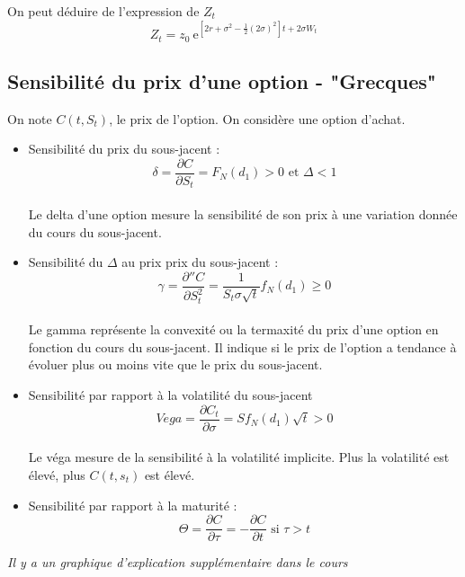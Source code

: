 \documentclass{report}
\newcommand{\e}{\mbox{e}}
\begin{document}
On peut déduire de l'expression de $Z_t$\[Z_t = z_0\ \mbox{e}^{[2r+\sigma^2-\frac{1}{2}(2\sigma)^2]t+2\sigma W_t}\]
\newpage


\subsection{Sensibilité du prix d'une option - "Grecques"}

On note $C(t, S_t)$, le prix de l'option. On considère une option d'achat.
\begin{itemize}
    \item Sensibilité du prix du sous-jacent : \[\delta = \displaystyle\frac{\partial C}{\partial S_t} = F_N(d_1) > 0 \mbox{ et }\Delta <1 \]\\
    Le delta d'une option mesure la sensibilité de son prix à une variation donnée du cours du sous-jacent.
    \item Sensibilité du $\Delta$ au prix prix du sous-jacent : \[\gamma = \displaystyle\frac{\partial''C}{\partial S^2_t} = \displaystyle\frac{1}{S_t\sigma\sqrt{t}}f_N(d_1)\geq 0\]\\
    Le gamma représente la convexité ou la termaxité du prix d'une option en fonction du cours du sous-jacent. Il indique si le prix de l'option a tendance à évoluer plus ou moins vite que le prix du sous-jacent.
    \item Sensibilité par rapport à la volatilité du sous-jacent \[Vega = \displaystyle\frac{\partial C_t}{\partial \sigma} = Sf_N(d_1)\sqrt{t} >0\]\\
    Le véga mesure de la sensibilité à la volatilité implicite. Plus la volatilité est élevé, plus $C(t,s_t)$ est élevé.
    \item Sensibilité par rapport à la maturité : \[\Theta = \displaystyle\frac{\partial C}{\partial \tau}=-\displaystyle\frac{\partial C}{\partial t} \mbox{    si }\tau>t\]

\end{itemize}
\vspace{0.2cm}
\textit{Il y a un graphique d'explication supplémentaire dans le cours}

\vspace{0.2cm}
\fbox{\textbf{NB : }$\ $\\ 

\[C(t,S_t)=S_tF_N(d_1)-K\e^{r\tau}F_N(d_2)\approx S_t-K\e^{r\tau}\mbox{ quand $S_t$ est grand, en effet }S_t\to \infty \Rightarrow \left\{\begin{array}{cc}
     F_N(d_1)\to 1\\
     F_N(d_2)\to 1 
\end{array}\right. \]
}
\end{document}

